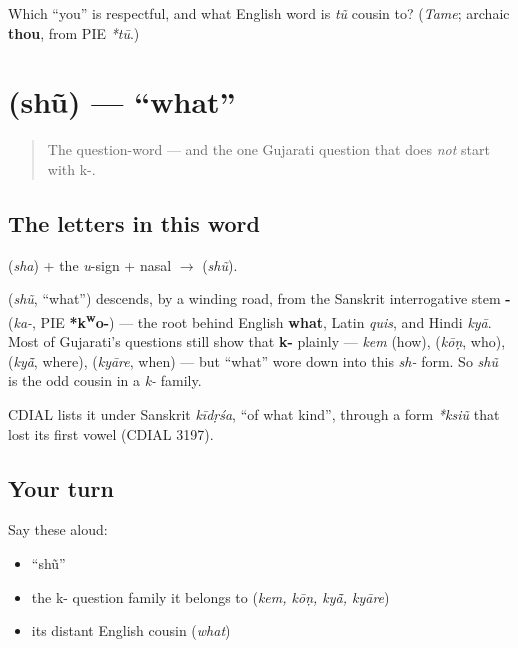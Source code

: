 \begin{tcolorbox}[breakable,colback=teal!4,colframe=teal!35!black,title={Before you move on}]
Which \textquotedblleft{}you\textquotedblright{} is respectful, and what English word is \emph{tũ} cousin to? (\emph{Tame}; archaic \textbf{thou}, from PIE \emph{*tū}.)
\end{tcolorbox}
\section[\texorpdfstring{\gu{શું} (shũ)}{શું (shũ)}]{ (shũ) — \textquotedblleft{}what\textquotedblright{}}

\label{lesson:GU-C02-shun}



\begin{quote}
The question-word — and the one Gujarati question that does \emph{not} start with k-.
\end{quote}

\subsection*{The letters in this word}
\textbf{} (\emph{sha}) + the \emph{u}-sign + nasal $\to$ \textbf{} (\emph{shũ}).

\begin{cousinweb}
\textbf{} (\emph{shũ}, \textquotedblleft{}what\textquotedblright{}) descends, by a winding road, from the Sanskrit interrogative stem \textbf{-} (\emph{ka-}, PIE \textbf{*k\textsuperscript{w}o-}) — the root behind English \textbf{what}, Latin \emph{quis}, and Hindi \emph{kyā}. Most of Gujarati's questions still show that \textbf{k-} plainly — \emph{kem} (how), \textbf{} (\emph{kōṇ}, who), \textbf{} (\emph{kyā̃}, where), \textbf{} (\emph{kyāre}, when) — but \textquotedblleft{}what\textquotedblright{} wore down into this \emph{sh-} form. So \emph{shũ} is the odd cousin in a \emph{k-} family.

CDIAL lists it under Sanskrit \emph{kīdṛśa}, \textquotedblleft{}of what kind\textquotedblright{}, through a form \emph{*ksiũ} that lost its first vowel (CDIAL 3197).
\end{cousinweb}

\subsection*{Your turn}
Say these aloud:

\begin{itemize}
\raggedright
  \item \textquotedblleft{}shũ\textquotedblright{}
  \item the k- question family it belongs to (\emph{kem, kōṇ, kyā̃, kyāre})
  \item its distant English cousin (\emph{what})
\end{itemize}

